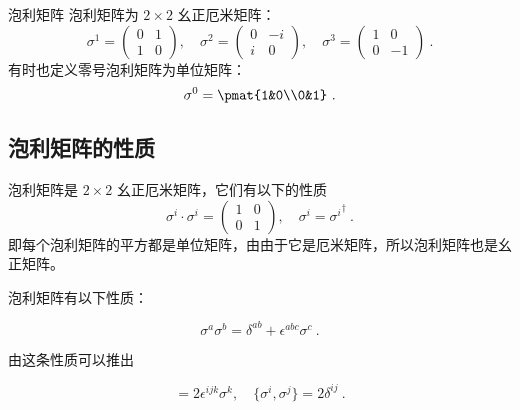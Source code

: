 \begin{definition}{泡利矩阵}\label{def_pauliM_1}
泡利矩阵为 $2\times 2$ 幺正厄米矩阵：
\begin{equation}
\sigma^1 = \begin{pmatrix}
0 & 1\\
1 & 0
\end{pmatrix},\quad 
\sigma^2 = \begin{pmatrix}
0 & -i\\
i & 0
\end{pmatrix},\quad 
\sigma^3 = 
\begin{pmatrix}
1 & 0\\
0 & -1
\end{pmatrix}
~.
\end{equation}
有时也定义零号泡利矩阵为单位矩阵：
\begin{equation}
\sigma^0 = \pmat{1&0\\0&1}~.
\end{equation}

\end{definition}

\subsection{泡利矩阵的性质}
泡利矩阵是 $2\times 2$ 幺正厄米矩阵，它们有以下的性质
\begin{equation}
\sigma^i\cdot \sigma^i = \begin{pmatrix}1&0\\0&1\end{pmatrix},\quad \sigma^i = {\sigma^i}^\dagger~.
\end{equation}
即每个泡利矩阵的平方都是单位矩阵，由由于它是厄米矩阵，所以泡利矩阵也是幺正矩阵。

泡利矩阵有以下性质：
\begin{theorem}{}
\begin{equation}\label{eq_pauliM_1}
\sigma^a\sigma^b = \delta^{ab} + \epsilon^{abc}\sigma^c~.
\end{equation}
\end{theorem}
由这条性质可以推出
\begin{lemma}{}
\begin{equation}
[\sigma^i,\sigma^j] = 2\epsilon^{ijk}\sigma^k,\quad \{\sigma^i,\sigma^j\}=2\delta^{ij}~.
\end{equation}

\end{lemma}

